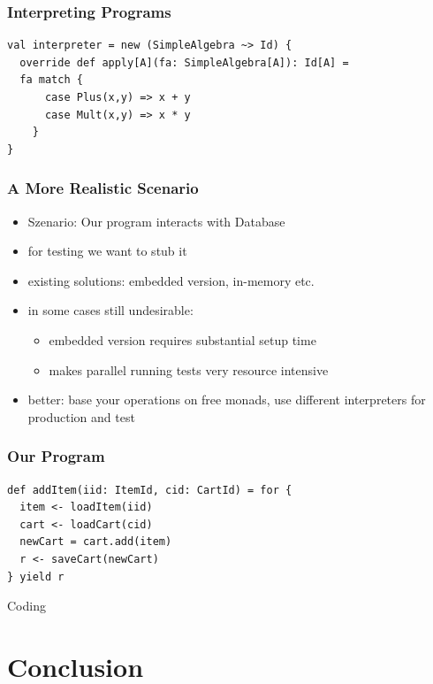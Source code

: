 \documentclass{beamer}
\begin{document}
\begin{frame}[fragile]
  \frametitle{Interpreting Programs}
\begin{verbatim}
val interpreter = new (SimpleAlgebra ~> Id) {
  override def apply[A](fa: SimpleAlgebra[A]): Id[A] =
  fa match {
      case Plus(x,y) => x + y
      case Mult(x,y) => x * y
    }
}
\end{verbatim}
\end{frame}

\begin{frame}
  \frametitle{A More Realistic Scenario}
  \begin{itemize}
  \item Szenario: Our program interacts with Database
  \item<1> for testing we want to stub it
  \item<1> existing solutions: embedded version, in-memory etc.
  \item<2> in some cases still undesirable:
    \begin{itemize}
    \item embedded version requires substantial setup time
    \item makes parallel running tests very resource intensive
    \end{itemize}
  \item<2> better: base your operations on free monads, use different
    interpreters for production and test
  \end{itemize}
\end{frame}

\begin{frame}[fragile]
  \frametitle{Our Program}
\begin{verbatim}
def addItem(iid: ItemId, cid: CartId) = for {
  item <- loadItem(iid)
  cart <- loadCart(cid)
  newCart = cart.add(item)
  r <- saveCart(newCart)
} yield r
\end{verbatim}
\end{frame}

\begin{frame}
  \begin{center}
    \Huge
    Coding
  \end{center}

\end{frame}

\section{Conclusion}
\end{document}
